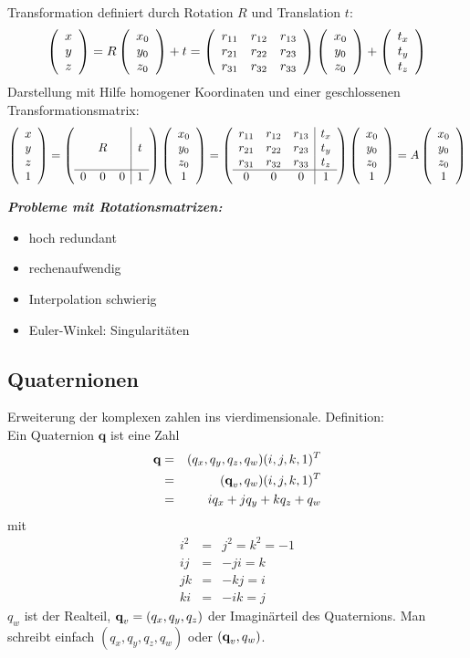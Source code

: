 Transformation definiert durch Rotation $R$ und Translation $t$:
$$\left( \begin{array}{c} x \\ y \\ z \end{array} \right) = R \left( \begin{array}{c} x_0 \\ y_0 \\ z_0 \end{array} \right) + t = \left( \begin{array}{ccc} r_{11} & r_{12} & r_{13} \\ r_{21} & r_{22} & r_{23} \\ r_{31} & r_{32} & r_{33} \end{array} \right) \left( \begin{array}{c} x_0 \\ y_0 \\ z_0 \end{array} \right) + \left( \begin{array}{c} t_x \\ t_y \\ t_z \end{array} \right)$$
Darstellung mit Hilfe homogener Koordinaten und einer geschlossenen Transformationsmatrix:
$$\left( \begin{array}{c} x \\ y \\ z \\ 1 \end{array} \right) = \left( \begin{array}{ccc|c} &&& \\ & R && t \\ &&& \\ \hline 0 & 0 & 0 & 1 \end{array} \right) \left( \begin{array}{c} x_0 \\ y_0 \\ z_0 \\ 1 \end{array} \right) = \left( \begin{array}{ccc|c} r_{11} & r_{12} & r_{13} & t_x \\ r_{21} & r_{22} & r_{23} & t_y \\ r_{31} & r_{32} & r_{33} & t_z \\ \hline 0 & 0 & 0 & 1 \end{array} \right) \left( \begin{array}{c} x_0 \\ y_0 \\ z_0 \\ 1 \end{array} \right) = A \left( \begin{array}{c} x_0 \\ y_0 \\ z_0 \\ 1 \end{array} \right)$$

\textbf{\textsl{Probleme mit Rotationsmatrizen:}}
\begin{itemize}
\item hoch redundant
\item rechenaufwendig
\item Interpolation schwierig
\item Euler-Winkel: Singularitäten
\end{itemize}

\subsection{Quaternionen}

Erweiterung der komplexen zahlen ins vierdimensionale. Definition: \\[0,1cm]
Ein Quaternion $\textbf{q}$ ist eine Zahl
\begin{eqnarray*}
\textbf{q} &=& (q_x,q_y,q_z,q_w)(i,j,k,1)^T \\ &=& (\textbf{q}_v,q_w)(i,j,k,1)^T \\ &=& iq_x + jq_y + kq_z + q_w
\end{eqnarray*}
mit
\begin{eqnarray*}
i^2 &=& j^2 = k^2 = -1 \\ ij &=& -ji = k \\ jk &=& -kj = i \\ ki &=& -ik = j
\end{eqnarray*}
$q_w$ ist der Realteil, $\textbf{q}_v = (q_x,q_y,q_z)$ der Imaginärteil des Quaternions. Man schreibt einfach $(q_x,q_y,q_z,q_w)$ oder $(\textbf{q}_v,q_w)$. \\[0,1cm]

